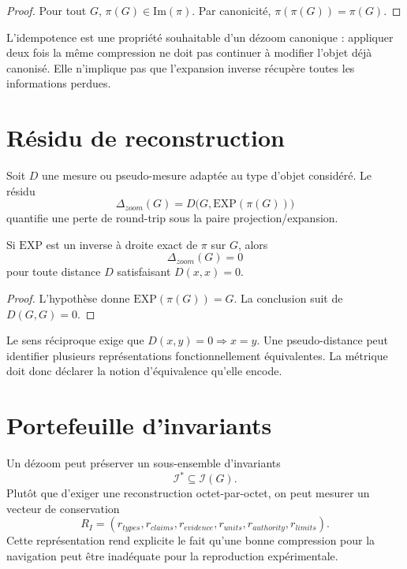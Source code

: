 \begin{proof}
Pour tout $G$, $\pi(G)\in\mathrm{Im}(\pi)$. Par canonicité, $\pi(\pi(G))=\pi(G)$.
\end{proof}

\begin{observation}
L'idempotence est une propriété souhaitable d'un dézoom canonique : appliquer deux fois la même compression ne doit pas continuer à modifier l'objet déjà canonisé. Elle n'implique pas que l'expansion inverse récupère toutes les informations perdues.
\end{observation}

\section{Résidu de reconstruction}

Soit $D$ une mesure ou pseudo-mesure adaptée au type d'objet considéré. Le résidu
\[
\Delta_{zoom}(G)=D\bigl(G,\mathrm{EXP}(\pi(G))\bigr)
\]
quantifie une perte de round-trip sous la paire projection/expansion.

\begin{proposition}
Si $\mathrm{EXP}$ est un inverse à droite exact de $\pi$ sur $G$, alors
\[
\Delta_{zoom}(G)=0
\]
pour toute distance $D$ satisfaisant $D(x,x)=0$.
\end{proposition}

\begin{proof}
L'hypothèse donne $\mathrm{EXP}(\pi(G))=G$. La conclusion suit de $D(G,G)=0$.
\end{proof}

\begin{limitation}
Le sens réciproque exige que $D(x,y)=0\Rightarrow x=y$. Une pseudo-distance peut identifier plusieurs représentations fonctionnellement équivalentes. La métrique doit donc déclarer la notion d'équivalence qu'elle encode.
\end{limitation}

\section{Portefeuille d'invariants}

Un dézoom peut préserver un sous-ensemble d'invariants
\[
\mathcal I^*\subseteq\mathcal I(G).
\]
Plutôt que d'exiger une reconstruction octet-par-octet, on peut mesurer un vecteur de conservation
\[
R_I=(r_{types},r_{claims},r_{evidence},r_{units},r_{authority},r_{limits}).
\]
Cette représentation rend explicite le fait qu'une bonne compression pour la navigation peut être inadéquate pour la reproduction expérimentale.

